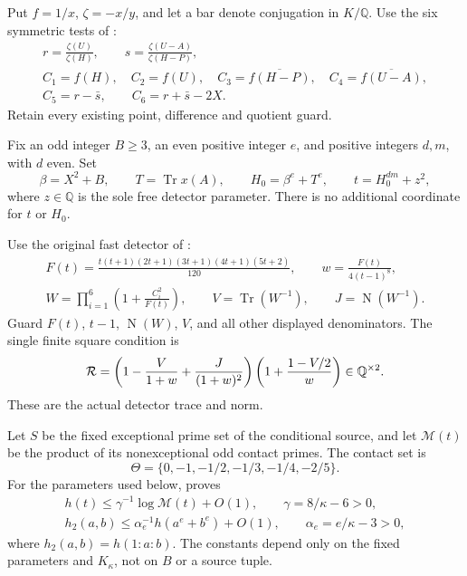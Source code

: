 \documentclass[11pt,a4paper]{article}
\newcommand{\Q}{\mathbb Q}\newcommand{\Z}{\mathbb Z}
\DeclareMathOperator{\Tr}{Tr}
\DeclareMathOperator{\Nm}{N}
\begin{document}
Put \(f=1/x\), \(\zeta=-x/y\), and let a bar denote conjugation in \(K/\Q\).
Use the six symmetric tests of \cite{Reweighted}:
\begin{equation}\label{eq:tests}
 \begin{gathered}
 r=\frac{\zeta(U)}{\zeta(H)},\qquad
 s=\frac{\zeta(U-A)}{\zeta(H-P)},\\
 C_1=f(H),\quad C_2=f(U),\quad
 C_3=\overline{f(H-P)},\quad C_4=\overline{f(U-A)},\\
 C_5=r-\bar s,\qquad C_6=r+\bar s-2X.
 \end{gathered}
\end{equation}
Retain every existing point, difference and quotient guard.

Fix an odd integer \(B\ge3\), an even positive integer \(e\), and positive
integers \(d,m\), with \(d\) even. Set
\begin{equation}\label{eq:argument}
 \beta=X^2+B,\qquad T=\Tr x(A),\qquad
 H_0=\beta^e+T^e,\qquad t=H_0^{dm}+z^2,
\end{equation}
where \(z\in\Q\) is the sole free detector parameter.
There is no additional coordinate for \(t\) or \(H_0\).

Use the original fast detector of \cite{Reweighted}:
\begin{equation}\label{eq:detector}
 \begin{gathered}
 F(t)=\frac{t(t+1)(2t+1)(3t+1)(4t+1)(5t+2)}{120},
 \qquad w=\frac{F(t)}{4(t-1)^8},\\
 W=\prod_{i=1}^6\left(1+\frac{C_i^2}{F(t)}\right),\qquad
 V=\Tr(W^{-1}),\qquad J=\Nm(W^{-1}).
 \end{gathered}
\end{equation}
Guard \(F(t)\), \(t-1\), \(\Nm(W)\), \(V\), and all other displayed
denominators. The single finite square condition is
\begin{equation}\label{eq:square}
 {\cal R}=
 \left(1-\frac{V}{1+w}+\frac{J}{(1+w)^2}\right)
 \left(1+\frac{1-V/2}{w}\right)\in\Q^{\times2}.
\end{equation}
These are the actual detector trace and norm.

Let \(S\) be the fixed exceptional prime set of the conditional source,
and let \(\mathcal M(t)\) be the product of its nonexceptional odd
contact primes. The contact set is
\[
 \Theta=\{0,-1,-1/2,-1/3,-1/4,-2/5\}.
\]
For the parameters used below, \cite{Conditional} proves
\begin{equation}\label{eq:heights}
 \begin{gathered}
 h(t)\le\gamma^{-1}\log\mathcal M(t)+O(1),
       \qquad \gamma=8/\kappa-6>0,\\
 h_2(a,b)\le\alpha_e^{-1}h(a^e+b^e)+O(1),
       \qquad \alpha_e=e/\kappa-3>0,
 \end{gathered}
\end{equation}
where \(h_2(a,b)=h(1:a:b)\). The constants depend only on the fixed
parameters and \(K_\kappa\), not on \(B\) or a source tuple.
\end{document}
